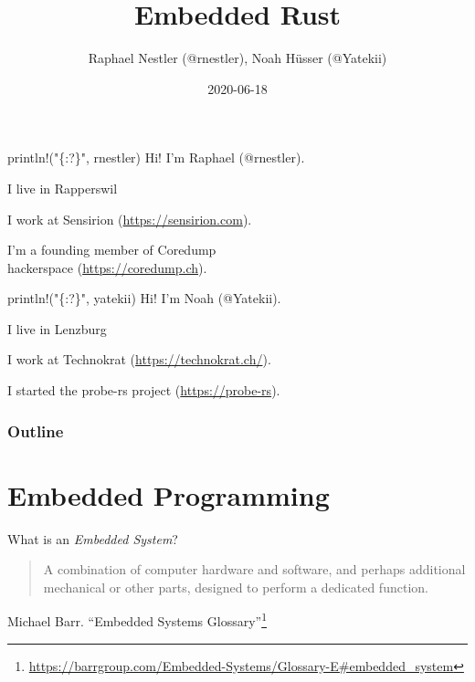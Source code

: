 \documentclass[aspectratio=1610,14pt,t]{beamer}
\title{Embedded Rust}
\date{2020-06-18}
\author{Raphael Nestler (@rnestler), Noah Hüsser (@Yatekii)}
\institute{Rust Zürichsee Meetup}
\begin{document}
\pagecolor{almostwhite}  %
\maketitle


\begin{frame}[c]{println!("\{:?\}", rnestler)}
  Hi! I'm Raphael (@rnestler).

  \pause I live in Rapperswil

  \pause I work at Sensirion ({\small \url{https://sensirion.com}}).

  \pause I'm a founding member of Coredump\\hackerspace ({\small \url{https://coredump.ch}}).
\end{frame}

\begin{frame}[c]{println!("\{:?\}", yatekii)}
  Hi! I'm Noah (@Yatekii).

  \pause I live in Lenzburg

  \pause I work at Technokrat ({\small \url{https://technokrat.ch/}}).

  \pause I started the probe-rs project ({\small \url{https://probe-rs}}).
\end{frame}


\begin{frame}
  \frametitle{Outline}
  \setcounter{tocdepth}{1}
  \tableofcontents
\end{frame}



\section{Embedded Programming}

\begin{frame}[c]{What is an \emph{Embedded System}?}
  \begin{quote}
    A combination of computer hardware and software, and perhaps
    additional mechanical or other parts, designed to perform a dedicated
    function.
  \end{quote}
  Michael Barr. ``Embedded Systems Glossary''\footnote{\tiny\url{https://barrgroup.com/Embedded-Systems/Glossary-E\#embedded\_system}}
\end{frame}
\end{document}
